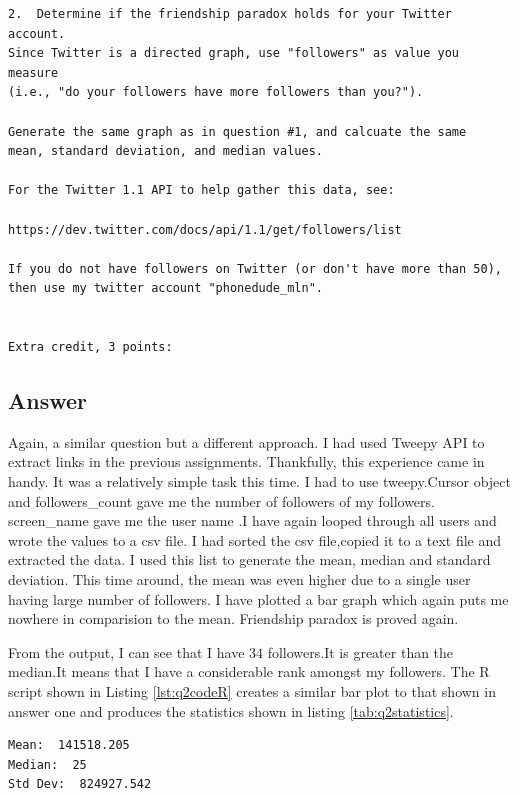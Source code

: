 \documentclass[letterpaper,11pt]{article}
\begin{document}
\begin{verbatim}
2.  Determine if the friendship paradox holds for your Twitter account.
Since Twitter is a directed graph, use "followers" as value you measure
(i.e., "do your followers have more followers than you?").

Generate the same graph as in question #1, and calcuate the same 
mean, standard deviation, and median values.

For the Twitter 1.1 API to help gather this data, see:

https://dev.twitter.com/docs/api/1.1/get/followers/list

If you do not have followers on Twitter (or don't have more than 50),
then use my twitter account "phonedude_mln".


Extra credit, 3 points:
\end{verbatim}

\newpage
\subsection*{Answer}
Again, a similar question but a different approach. I had used Tweepy API to extract links in the previous assignments. Thankfully, this experience came in handy. It was a relatively simple task this time. 
I had to use tweepy.Cursor object and followers\_count gave me the number of followers of my followers. screen\_name gave me the user name .I have again looped through all users and wrote the values to a csv file. I had  sorted the csv file,copied it to a text file and extracted the data.
I used this list to generate the mean, median and standard deviation. This time around, the mean was even higher due to a single user having large number of followers. I have plotted a bar graph  which again puts me nowhere in comparision to the mean. Friendship paradox is proved again.





From the output, I can see that I have $34$ followers.It is greater than the median.It means that I have a considerable rank amongst my followers. The R script shown in Listing \ref{lst:q2codeR} creates a similar bar plot to that shown in answer one and produces the statistics shown in listing \ref{tab:q2statistics}.

\begin{lstlisting}[frame=single]
Mean:  141518.205
Median:  25
Std Dev:  824927.542

     
\end{lstlisting}
\end{document}
